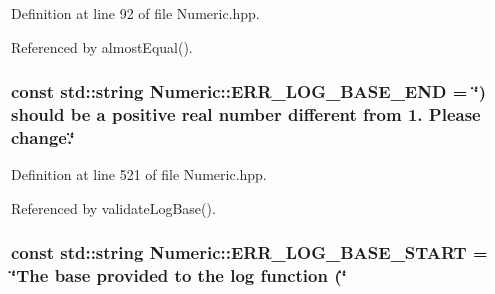 \-Definition at line 92 of file \-Numeric.\-hpp.



\-Referenced by almost\-Equal().

\hypertarget{classmultiscale_1_1Numeric_a291c98ea0c6e6c4042fe9ecc4af0443a}{
\subsubsection[{\-E\-R\-R\-\_\-\-L\-O\-G\-\_\-\-B\-A\-S\-E\-\_\-\-E\-N\-D}]{\setlength{\rightskip}{0pt plus 5cm}const std\-::string {\bf \-Numeric\-::\-E\-R\-R\-\_\-\-L\-O\-G\-\_\-\-B\-A\-S\-E\-\_\-\-E\-N\-D} = \char`\"{}) should be a positive real number different from 1. \-Please change.\char`\"{}}}\label{classmultiscale_1_1Numeric_a291c98ea0c6e6c4042fe9ecc4af0443a}


\-Definition at line 521 of file \-Numeric.\-hpp.



\-Referenced by validate\-Log\-Base().

\hypertarget{classmultiscale_1_1Numeric_a551052e6be615efea82ea046ba178010}{
\subsubsection[{\-E\-R\-R\-\_\-\-L\-O\-G\-\_\-\-B\-A\-S\-E\-\_\-\-S\-T\-A\-R\-T}]{\setlength{\rightskip}{0pt plus 5cm}const std\-::string {\bf \-Numeric\-::\-E\-R\-R\-\_\-\-L\-O\-G\-\_\-\-B\-A\-S\-E\-\_\-\-S\-T\-A\-R\-T} = \char`\"{}\-The base provided to the {\bf log} function (\char`\"{}}}\label{classmultiscale_1_1Numeric_a551052e6be615efea82ea046ba178010}



